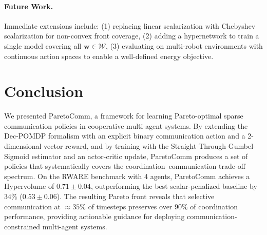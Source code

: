 \documentclass[runningheads]{llncs}
\newcommand{\W}{\mathcal{W}}
\newcommand{\bw}{\mathbf{w}}
\begin{document}
\paragraph{Future Work.}
Immediate extensions include: (1) replacing linear scalarization with
Chebyshev scalarization for non-convex front coverage,
(2) adding a hypernetwork to train a single model covering all
$\bw \in \W$, (3) evaluating on multi-robot environments with
continuous action spaces to enable a well-defined energy objective.

\section{Conclusion}
\label{sec:conclusion}

We presented ParetoComm, a framework for learning Pareto-optimal
sparse communication policies in cooperative multi-agent systems.
By extending the Dec-POMDP formalism with an explicit binary
communication action and a 2-dimensional vector reward, and by
training with the Straight-Through Gumbel-Sigmoid estimator and an
actor-critic update, ParetoComm produces a set of policies that
systematically covers the coordination--communication trade-off
spectrum.
On the RWARE benchmark with 4 agents, ParetoComm achieves a
Hypervolume of $0.71 \pm 0.04$, outperforming the best
scalar-penalized baseline by $34\%$ ($0.53 \pm 0.06$).
The resulting Pareto front reveals that selective communication at
$\approx 35\%$ of timesteps preserves over $90\%$ of coordination
performance, providing actionable guidance for deploying
communication-constrained multi-agent systems.



\end{document}
